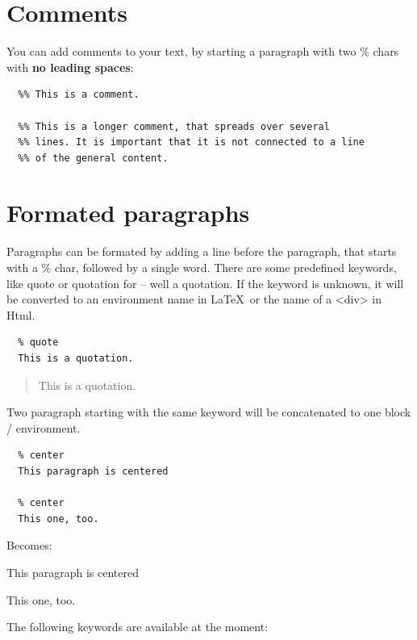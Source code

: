 \documentclass{article}
\begin{document}
\section{Comments}

{You can add comments to your text, by starting a paragraph
with two \% chars with \textbf{no leading spaces}:\\}

\begin{verbatim}
  %% This is a comment.

  %% This is a longer comment, that spreads over several
  %% lines. It is important that it is not connected to a line
  %% of the general content.
\end{verbatim}


\section{Formated paragraphs}

{Paragraphs can be formated by adding a line before the
paragraph, that starts with a \% char, followed by a single
word. There are some predefined keywords, like quote or
quotation for – well a quotation.
If the keyword is unknown, it will be converted to an environment
name in \LaTeX\  or the name of a <div> in Html.\\}

\begin{verbatim}
  % quote
  This is a quotation.
\end{verbatim}


\begin{quote}
This is a quotation.
\end{quote}


{Two paragraph starting with the same keyword will be
concatenated to one block / environment.\\}

\begin{verbatim}
  % center
  This paragraph is centered

  % center
  This one, too.
\end{verbatim}


{Becomes:\\}

\begin{center}
This paragraph is centered

This one, too.
\end{center}


{The following keywords are available at the moment:\\}
\end{document}
